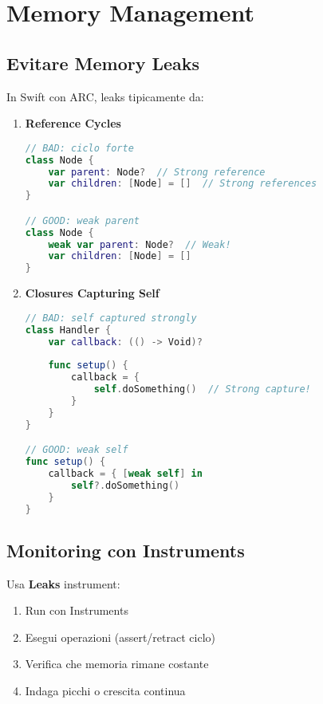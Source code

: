 \section{Memory Management}

\subsection{Evitare Memory Leaks}

In Swift con ARC, leaks tipicamente da:

\begin{enumerate}
\item \textbf{Reference Cycles}

\begin{lstlisting}[language=Swift]
// BAD: ciclo forte
class Node {
    var parent: Node?  // Strong reference
    var children: [Node] = []  // Strong references
}

// GOOD: weak parent
class Node {
    weak var parent: Node?  // Weak!
    var children: [Node] = []
}
\end{lstlisting}

\item \textbf{Closures Capturing Self}

\begin{lstlisting}[language=Swift]
// BAD: self captured strongly
class Handler {
    var callback: (() -> Void)?
    
    func setup() {
        callback = {
            self.doSomething()  // Strong capture!
        }
    }
}

// GOOD: weak self
func setup() {
    callback = { [weak self] in
        self?.doSomething()
    }
}
\end{lstlisting}
\end{enumerate}

\subsection{Monitoring con Instruments}

Usa \textbf{Leaks} instrument:

\begin{enumerate}
\item Run con Instruments
\item Esegui operazioni (assert/retract ciclo)
\item Verifica che memoria rimane costante
\item Indaga picchi o crescita continua
\end{enumerate}

